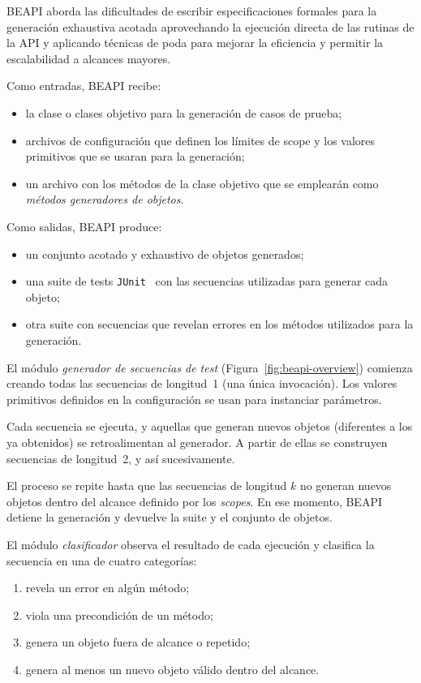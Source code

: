 \textsf{BEAPI} aborda las dificultades de escribir especificaciones formales 
para la generación exhaustiva acotada aprovechando la ejecución directa de las 
rutinas de la API y aplicando técnicas de poda para mejorar la eficiencia y 
permitir la escalabilidad a alcances mayores.

Como entradas, \textsf{BEAPI} recibe:
\begin{itemize}
    \item la clase o clases objetivo para la generación de casos de prueba;
    \item archivos de configuración que definen los límites de scope y los valores primitivos que se usaran para la generación;
    \item un archivo con los métodos de la clase objetivo que se emplearán 
    como \emph{métodos generadores de objetos}.
\end{itemize}

Como salidas, \textsf{BEAPI} produce:
\begin{itemize}
    \item un conjunto acotado y exhaustivo de objetos generados;
    \item una suite de tests \texttt{JUnit}~\cite{junit} con las secuencias 
    utilizadas para generar cada objeto;
    \item otra suite con secuencias que revelan errores en los métodos utilizados 
    para la generación.
\end{itemize}

El módulo \emph{generador de secuencias de test} (Figura~\ref{fig:beapi-overview}) 
comienza creando todas las secuencias de longitud~1 (una única invocación).  
Los valores primitivos definidos en la configuración se usan para instanciar 
parámetros.  

Cada secuencia se ejecuta, y aquellas que generan nuevos objetos (diferentes 
a los ya obtenidos) se retroalimentan al generador. A partir de ellas se 
construyen secuencias de longitud~2, y así sucesivamente.  

El proceso se repite hasta que las secuencias de longitud $k$ no generan nuevos 
objetos dentro del alcance definido por los \emph{scopes}. En ese momento, 
\textsf{BEAPI} detiene la generación y devuelve la suite y el conjunto de 
objetos.

El módulo \emph{clasificador} observa el resultado de cada ejecución y clasifica 
la secuencia en una de cuatro categorías:
\begin{enumerate}
    \item revela un error en algún método;
    \item viola una precondición de un método;
    \item genera un objeto fuera de alcance o repetido;
    \item genera al menos un nuevo objeto válido dentro del alcance.
\end{enumerate}

